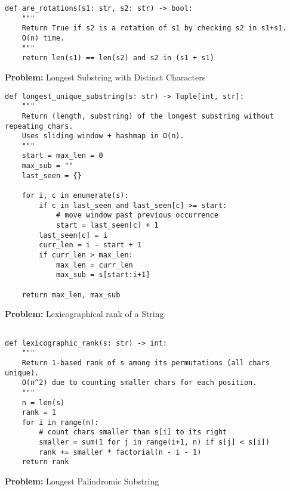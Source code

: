 \begin{verbatim}
def are_rotations(s1: str, s2: str) -> bool:
    """
    Return True if s2 is a rotation of s1 by checking s2 in s1+s1.
    O(n) time.
    """
    return len(s1) == len(s2) and s2 in (s1 + s1)
\end{verbatim}
\noindent\textbf{Problem:} Longest Substring with Distinct Characters
\begin{verbatim}
def longest_unique_substring(s: str) -> Tuple[int, str]:
    """
    Return (length, substring) of the longest substring without repeating chars.
    Uses sliding window + hashmap in O(n).
    """
    start = max_len = 0
    max_sub = ""
    last_seen = {}

    for i, c in enumerate(s):
        if c in last_seen and last_seen[c] >= start:
            # move window past previous occurrence
            start = last_seen[c] + 1
        last_seen[c] = i
        curr_len = i - start + 1
        if curr_len > max_len:
            max_len = curr_len
            max_sub = s[start:i+1]

    return max_len, max_sub
\end{verbatim}
\noindent\textbf{Problem:} Lexicographical rank of a String
\begin{verbatim}

def lexicographic_rank(s: str) -> int:
    """
    Return 1-based rank of s among its permutations (all chars unique).
    O(n^2) due to counting smaller chars for each position.
    """
    n = len(s)
    rank = 1
    for i in range(n):
        # count chars smaller than s[i] to its right
        smaller = sum(1 for j in range(i+1, n) if s[j] < s[i])
        rank += smaller * factorial(n - i - 1)
    return rank
\end{verbatim}
\noindent\textbf{Problem:} Longest Palindromic Substring
